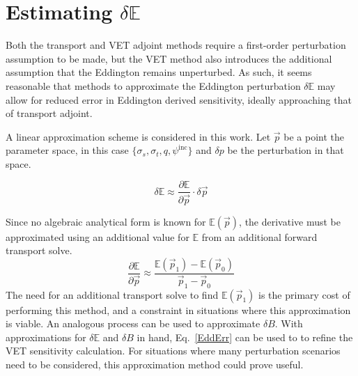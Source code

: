 \documentclass[12pt]{report}
\newcommand{\vp}{\vec{p}}
\newcommand{\Edd}{\mathbb{E}}
\newcommand{\BEdd}{B}
\begin{document}
\section{Estimating $\delta \Edd$}
Both the transport and VET adjoint methods require a first-order perturbation assumption to be made, but the VET method also introduces the additional assumption that the Eddington remains unperturbed. As such, it seems reasonable that methods to approximate the Eddington perturbation $\delta \Edd$ may allow for reduced error in Eddington derived sensitivity, ideally approaching that of transport adjoint. 

A linear approximation scheme is considered in this work. Let $\vp$ be a point the  parameter space, in this case $\lbrace \sigma_s , \sigma_t, q, \psi^{\text{inc}} \rbrace$ and $\delta p$ be the perturbation in that space.

\begin{equation}
\delta \Edd \approx \frac{\partial \Edd}{\partial \vp} \cdot \delta \vp
\end{equation}

Since no algebraic analytical form is known for $\Edd ( \vp )$, the derivative must be approximated using an additional value for $\Edd$ from an additional forward transport solve.
\begin{equation}
\label{Eddapprox}
\frac{\partial \Edd}{\partial \vp} \approx \frac{\Edd(\vp_1) - \Edd(\vp_0)}{\vp_1 - \vp_0}
\end{equation}
The need for an additional transport solve to find $\Edd(\vp_1)$ is the primary cost of performing this method, and a constraint in situations where this approximation is viable. An analogous process can be used to approximate $\delta \BEdd$. With approximations for $\delta \Edd$ and $\delta \BEdd$ in hand, Eq.~\eqref{EddErr} can be used to to refine the VET sensitivity calculation. For situations where many perturbation scenarios need to be considered, this approximation method could prove useful. 


\end{document}
